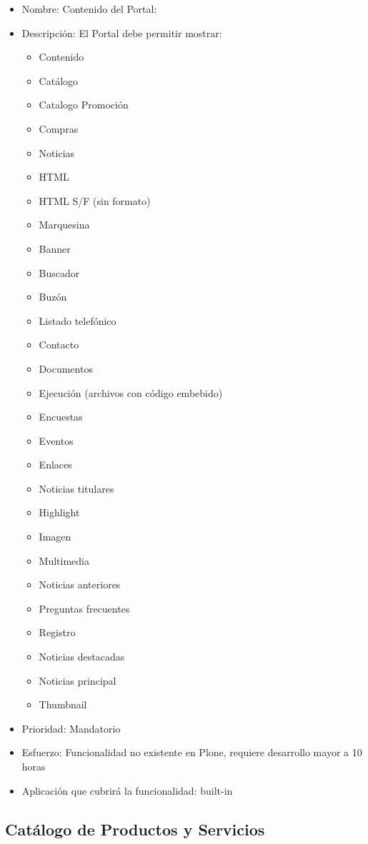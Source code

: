 \documentclass[11pt, letterpaper, oneside, spanish]{scrbook}
\begin{document}
\begin{itemize}
\item Nombre: Contenido del Portal:
\item Descripción: El Portal debe permitir mostrar:
\begin{itemize}
\item Contenido
\item Catálogo
\item Catalogo Promoción
\item Compras
\item Noticias
\item HTML
\item HTML S/F (sin formato)
\item Marquesina
\item Banner
\item Buscador
\item Buzón
\item Listado telefónico
\item Contacto
\item Documentos
\item Ejecución (archivos con código embebido)
\item Encuestas
\item Eventos
\item Enlaces
\item Noticias titulares
\item Highlight
\item Imagen
\item Multimedia
\item Noticias anteriores
\item Preguntas frecuentes
\item Registro
\item Noticias destacadas
\item Noticias principal
\item Thumbnail
\end{itemize}
\item Prioridad: Mandatorio
\item Esfuerzo: Funcionalidad no existente en Plone, requiere desarrollo mayor a
  10 horas
\item Aplicación que cubrirá la funcionalidad:  built-in
\end{itemize}
\subsection{Catálogo de Productos y Servicios}
\label{sec-2-1-22}
\end{document}
